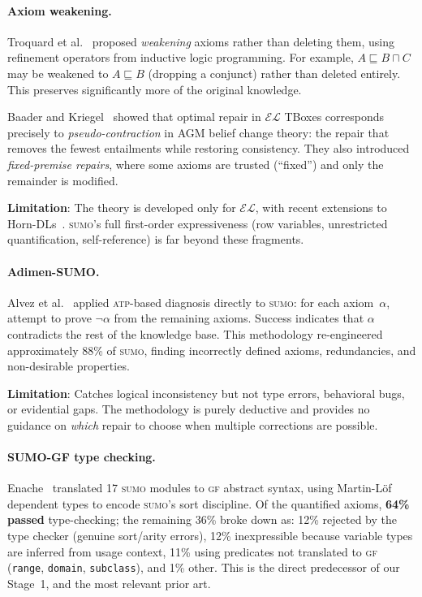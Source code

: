 \documentclass[11pt]{article}
\newcommand{\SUMO}{\textsc{sumo}}
\newcommand{\GF}{\textsc{gf}}
\newcommand{\ATP}{\textsc{atp}}
\theoremstyle{definition}
\theoremstyle{plain}
\begin{document}
\paragraph{Axiom weakening.}
Troquard et al.~\cite{troquard2018weakening} proposed \emph{weakening}
axioms rather than deleting them, using refinement operators from
inductive logic programming.  For example,
$A \sqsubseteq B \sqcap C$ may be weakened to $A \sqsubseteq B$
(dropping a conjunct) rather than deleted entirely.  This preserves
significantly more of the original knowledge.

Baader and Kriegel~\cite{baader2023pseudocontraction,baader2022fixedpremise}
showed that optimal repair in $\mathcal{EL}$ TBoxes corresponds
precisely to \emph{pseudo-contraction} in AGM belief change theory:
the repair that removes the fewest entailments while restoring
consistency.  They also introduced \emph{fixed-premise repairs}, where
some axioms are trusted (``fixed'') and only the remainder is modified.

\textbf{Limitation}: The theory is developed only for $\mathcal{EL}$,
with recent extensions to Horn-DLs~\cite{baader2022fixedpremise}.
\SUMO{}'s full first-order expressiveness (row variables, unrestricted
quantification, self-reference) is far beyond these fragments.

\paragraph{Adimen-SUMO.}
Alvez et al.~\cite{alvez2012adimensumo} applied \ATP{}-based diagnosis
directly to \SUMO{}: for each axiom~$\alpha$, attempt to prove
$\neg\alpha$ from the remaining axioms.  Success indicates that $\alpha$
contradicts the rest of the knowledge base.  This methodology
re-engineered approximately 88\% of \SUMO{}, finding incorrectly
defined axioms, redundancies, and non-desirable properties.

\textbf{Limitation}: Catches logical inconsistency but not type errors,
behavioral bugs, or evidential gaps.  The methodology is purely
deductive and provides no guidance on \emph{which} repair to choose
when multiple corrections are possible.

\paragraph{SUMO-GF type checking.}
Enache~\cite{enache2012sumogf} translated 17 \SUMO{} modules
to \GF{} abstract syntax, using Martin-L\"of dependent types to encode
\SUMO{}'s sort discipline.  Of the quantified axioms, \textbf{64\%
passed} type-checking; the remaining 36\% broke down as: 12\%
rejected by the type checker (genuine sort/arity errors), 12\%
inexpressible because variable types are inferred from usage context,
11\% using predicates not translated to \GF{} (\texttt{range},
\texttt{domain}, \texttt{subclass}), and 1\% other.  This is the
direct predecessor of our Stage~1, and the most relevant prior art.
\end{document}
